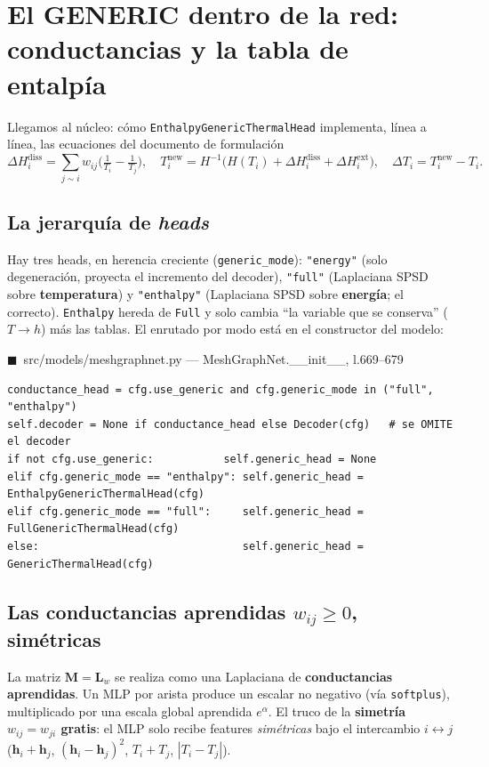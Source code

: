 \documentclass[11pt]{article}
\newcommand{\Lw}{\bm{L}_{w}}
\theoremstyle{definition}
\theoremstyle{plain}
\newcommand{\srcref}[1]{\par\smallskip\noindent
  {\footnotesize\ttfamily\textcolor{srcblue}{$\blacksquare$\ #1}}\par\vspace{1pt}}
\begin{document}
\section{El GENERIC dentro de la red: conductancias y la tabla de entalpía}
\label{sec:generic}

Llegamos al núcleo: cómo \texttt{EnthalpyGenericThermalHead} implementa, línea a
línea, las ecuaciones del documento de formulación
\[
  \Delta H_i^{\mathrm{diss}}=\sum_{j\sim i} w_{ij}\Big(\tfrac1{T_i}-\tfrac1{T_j}\Big),
  \quad
  T_i^{\mathrm{new}}=H^{-1}\!\big(H(T_i)+\Delta H_i^{\mathrm{diss}}+\Delta H_i^{\mathrm{ext}}\big),
  \quad
  \Delta T_i=T_i^{\mathrm{new}}-T_i .
\]

\subsection{La jerarquía de \emph{heads}}

Hay tres heads, en herencia creciente (\texttt{generic\_mode}):
\texttt{"energy"} (solo degeneración, proyecta el incremento del decoder),
\texttt{"full"} (Laplaciana SPSD sobre \textbf{temperatura}) y \texttt{"enthalpy"}
(Laplaciana SPSD sobre \textbf{energía}; el correcto). \texttt{Enthalpy} hereda de
\texttt{Full} y solo cambia ``la variable que se conserva'' ($T\rightarrow h$) más
las tablas. El enrutado por modo está en el constructor del modelo:

\srcref{src/models/meshgraphnet.py — MeshGraphNet.\_\_init\_\_, l.669--679}
\begin{lstlisting}
conductance_head = cfg.use_generic and cfg.generic_mode in ("full", "enthalpy")
self.decoder = None if conductance_head else Decoder(cfg)   # se OMITE el decoder
if not cfg.use_generic:           self.generic_head = None
elif cfg.generic_mode == "enthalpy": self.generic_head = EnthalpyGenericThermalHead(cfg)
elif cfg.generic_mode == "full":     self.generic_head = FullGenericThermalHead(cfg)
else:                                self.generic_head = GenericThermalHead(cfg)
\end{lstlisting}

\subsection{Las conductancias aprendidas $w_{ij}\ge0$, simétricas}

La matriz $\bm M=\Lw$ se realiza como una Laplaciana de \textbf{conductancias
aprendidas}. Un MLP por arista produce un escalar no negativo (vía
\texttt{softplus}), multiplicado por una escala global aprendida
$e^{\alpha}$. El truco de la \textbf{simetría $w_{ij}=w_{ji}$ gratis}: el MLP solo
recibe features \emph{simétricas} bajo el intercambio $i\leftrightarrow j$
($\bm h_i+\bm h_j$, $(\bm h_i-\bm h_j)^2$, $T_i+T_j$, $|T_i-T_j|$).
\end{document}
